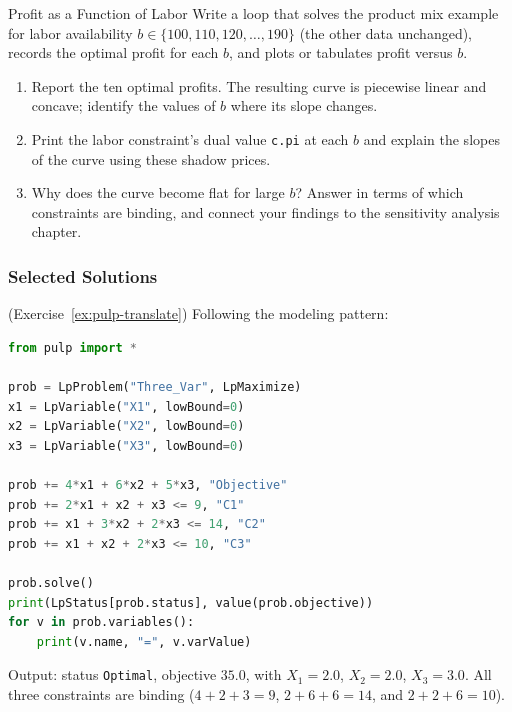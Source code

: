
\begin{ex}{Profit as a Function of Labor}{}
\label{ex:pulp-rhs-sweep}
Write a loop that solves the product mix example for labor availability $b \in \{100, 110, 120, \ldots, 190\}$ (the other data unchanged), records the optimal profit for each $b$, and plots or tabulates profit versus $b$.
\begin{enumerate}
\item Report the ten optimal profits. The resulting curve is piecewise linear and concave; identify the values of $b$ where its slope changes.
\item Print the labor constraint's dual value \texttt{c.pi} at each $b$ and explain the slopes of the curve using these shadow prices.
\item Why does the curve become flat for large $b$? Answer in terms of which constraints are binding, and connect your findings to the sensitivity analysis chapter.
\end{enumerate}
\end{ex}

\subsubsection*{Selected Solutions}

\begin{solution}(Exercise~\ref{ex:pulp-translate})
Following the modeling pattern:
\begin{lstlisting}[language=Python]
from pulp import *

prob = LpProblem("Three_Var", LpMaximize)
x1 = LpVariable("X1", lowBound=0)
x2 = LpVariable("X2", lowBound=0)
x3 = LpVariable("X3", lowBound=0)

prob += 4*x1 + 6*x2 + 5*x3, "Objective"
prob += 2*x1 + x2 + x3 <= 9, "C1"
prob += x1 + 3*x2 + 2*x3 <= 14, "C2"
prob += x1 + x2 + 2*x3 <= 10, "C3"

prob.solve()
print(LpStatus[prob.status], value(prob.objective))
for v in prob.variables():
    print(v.name, "=", v.varValue)
\end{lstlisting}
Output: status \texttt{Optimal}, objective $35.0$, with $X_1 = 2.0$, $X_2 = 2.0$, $X_3 = 3.0$. All three constraints are binding ($4+2+3 = 9$, $2+6+6 = 14$, and $2+2+6 = 10$).
\end{solution}

